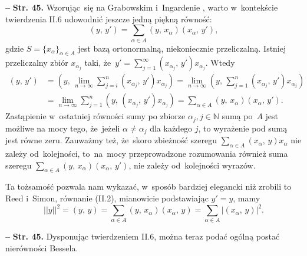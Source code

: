 \documentclass[a4paper,11pt]{article}
\newcommand{\mb}{\mathbb}
\newcommand{\ra}{\rightarrow}
\newcommand{\al}{\alpha}
\newcommand{\N}{\mb{N}}
\newcommand{\Lim}{\lim\limits}
\newcommand{\Sum}{\sum\limits}
\providecommand{\absj}[1]{\lvert #1 \rvert}
\newcommand{\norm}[1]{\left|\left| #1 \right|\right|}
\newcommand{\tb}{\textbf}
\newcommand{\noi}{\noindent}
\newcommand{\start}{\noi \tb{--} {}}
\newcommand{\Str}[1]{\tb{Str. #1.}}
\newcommand{\SP}[2]{( #1, \, #2 )} %
\begin{document}
\start \Str{45} Wzorując~się na Grabowskim i~Ingardenie
\cite{GrabowskiIngarden87}, warto w~kontekście twierdzenia II.6
udowodnić jeszcze jedną piękną równość:
\begin{equation*}
  \SP{ y }{ y' } = \Sum_{ \al \in A } \SP{ y }{ x_{ \al } }
  \SP{ x_{ \al } }{ y' },
\end{equation*}
gdzie $S = \{ x_{ \al } \}_{ \al \in A }$ jest bazą ortonormalną,
niekoniecznie przeliczalną. Istniej przeliczalny zbiór
$x_{ \al_{ j } }$ taki,
że~$y' = \Sum_{ j = 1 }^{ \infty } \SP{ x_{ \al_{ j } } }{ y' } x_{
  \al_{ j } }$. Wtedy
\begin{equation*}
  \begin{split}
    \SP{ y }{ y' } &= \SP{ y }{ \Lim_{ n \ra \infty } \Sum_{ j = i }^{
        n } \SP{ x_{ \al_{ j } } }{ y' } x_{ \al_{ j } } } = \Lim_{ n
      \ra \infty } \SP{ y }{ \Sum_{ j = 1 }^{ n } \SP{ x_{ \al_{ j } }
      }
      { y' } x_{ \al_{ j } } } \\
    &= \Lim_{ n \ra \infty } \Sum_{ j = 1 }^{ n } \SP{ y }{ \SP{ x_{
          \al_{ j } } }{ y' } x_{ \al_{ j } } }
    = \Sum_{ \al \in A } \SP{ y }{ x_{ \al } } \SP{ x_{ \al } }{ y' }.
  \end{split}
\end{equation*}
Zastąpienie w~ostatniej równości sumy po zbiorze
$\alpha_{ j }, j \in \N$ sumą po~$A$ jest możliwe na mocy tego,
że~jeżeli $\alpha \neq \alpha_{ j }$ dla każdego $j$, to wyrażenie pod
sumą jest równe zeru. Zauważmy też, że~skoro zbieżność szeregu
$\sum_{ \al \in A } \SP{ x_{ \al } }{ y } x_{ \al }$ nie zależy
od~kolejności, to~na~mocy przeprowadzone rozumowania również suma
szeregu
$\sum_{ \al \in A } \SP{ y }{ x_{ \al } } \SP{ x_{ \al } }{ y' }$, nie
zależy od~kolejności wyrazów.

Ta tożsamość pozwala nam wykazać, w~sposób bardziej elegancki niż
zrobili to Reed i~Simon, równanie (II.2), mianowicie podstawiając
$y' = y$, mamy
\begin{equation*}
  \norm{ y }^{ 2 } = \SP{ y }{ y } = \Sum_{ \al \in A } \SP{ y }{ x_{ \al } }
  \SP{ x_{ \al } }{ y } = \Sum_{ \al \in A } \absj{ \SP{ x_{ \al } }{ y } }^{ 2 }.
\end{equation*}


\start \Str{45} Dysponując twierdzeniem II.6, można teraz podać ogólną
postać nierówności Bessela.
\end{document}
